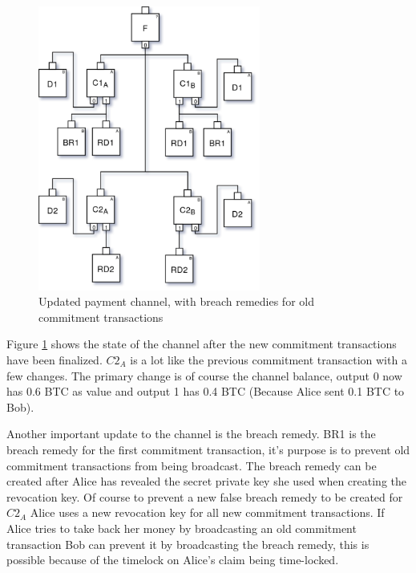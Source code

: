 \begin{figure}[H]
	\centering
	\includegraphics[width=0.65\textwidth]{background/images/payment_channel_updated.png}
	\caption{Updated payment channel, with breach remedies for old commitment transactions}
	\label{fig:pc-update}
\end{figure}

Figure \ref{fig:pc-update} shows the state of the channel after the new commitment transactions have been finalized. 
$C2_{A}$ is a lot like the previous commitment transaction with a few changes. The primary change is of course the channel balance, output 0 now has 0.6 BTC as value and output 1 has 0.4 BTC (Because Alice sent 0.1 BTC to Bob).

Another important update to the channel is the breach remedy. BR1 is the breach remedy for the first commitment transaction, it's purpose is to prevent old commitment transactions from being broadcast. The breach remedy can be created after Alice has revealed the secret private key she used when creating the revocation key. Of course to prevent a new false breach remedy to be created for $C2_{A}$ Alice uses a new revocation key for all new commitment transactions. If Alice tries to take back her money by broadcasting an old commitment transaction Bob can prevent it by broadcasting the breach remedy, this is possible because of the timelock on Alice's claim being time-locked.

